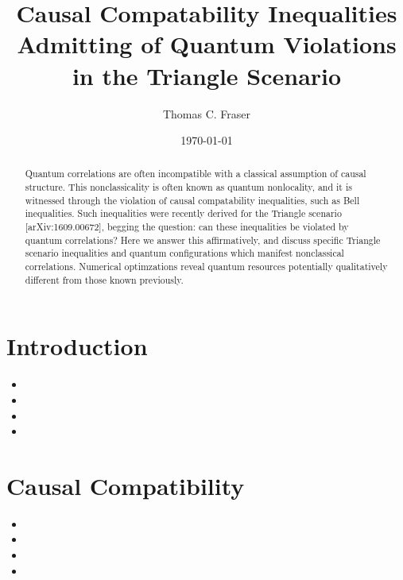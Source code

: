\documentclass[aps, 10pt, english, twoside, pra, nofootinbib, longbibliography]{revtex4-1}
\begin{document}
    \title{Causal Compatability Inequalities Admitting of Quantum Violations in the Triangle Scenario}
    \author{Thomas C. Fraser}
    \date{\today}
    \begin{abstract}
        Quantum correlations are often incompatible with a classical assumption of causal structure. This nonclassicality is often known as quantum nonlocality, and it is witnessed through the violation of causal compatability inequalities, such as Bell inequalities. Such inequalities were recently derived for the Triangle scenario [arXiv:1609.00672], begging the question: can these inequalities be violated by quantum correlations? Here we answer this affirmatively, and discuss specific Triangle scenario inequalities and quantum configurations which manifest nonclassical correlations. Numerical optimzations reveal quantum resources potentially qualitatively different from those known previously.
    \end{abstract}
    \maketitle
    \tableofcontents

    \section{Introduction}
    \begin{itemize}
        \item {}
        \item {}
        \item {}
        \item {}
    \end{itemize}

    \section{Causal Compatibility}
    \begin{itemize}
        \item {}
        \item {}
        \item {}
        \item {}
    \end{itemize}
\end{document}
